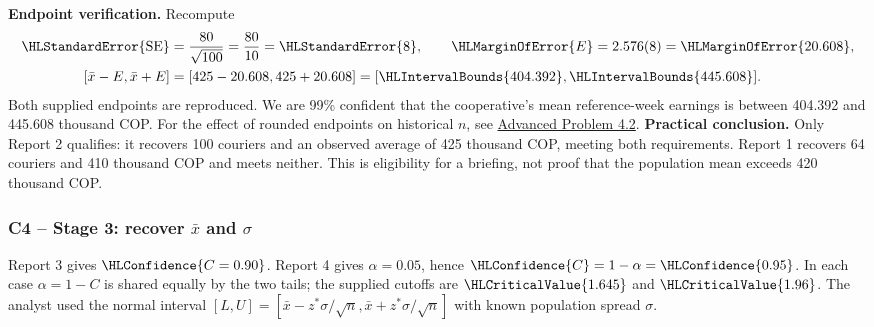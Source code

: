 \textbf{Endpoint verification.} Recompute
\[\begin{aligned}
\HLStandardError{\mathrm{SE}}&=\frac{80}{\sqrt{100}}=\frac{80}{10}=\HLStandardError{8},\qquad \HLMarginOfError{E}=2.576(8)=\HLMarginOfError{20.608},\\
[\bar x-E,\bar x+E]&=[425-20.608,425+20.608]=[\HLIntervalBounds{404.392},\HLIntervalBounds{445.608}].
\end{aligned}\]
Both supplied endpoints are reproduced. We are 99\% confident that the cooperative's mean reference-week earnings is between 404.392 and 445.608 thousand COP.
For the effect of rounded endpoints on historical $n$, see \hyperref[prob:c4-advanced-2]{Advanced Problem 4.2}.
\textbf{Practical conclusion.} Only Report 2 qualifies: it recovers 100 couriers and an observed average of 425 thousand COP, meeting both requirements. Report 1 recovers 64 couriers and 410 thousand COP and meets neither. This is eligibility for a briefing, not proof that the population mean exceeds 420 thousand COP.
\clearpage
\subsubsection*{C4 -- Stage 3: recover $\bar x$ and $\sigma$}\label{sol:c4-1-c}
\begingroup
\setlength{\abovedisplayskip}{6pt}
\setlength{\belowdisplayskip}{6pt}
\setlength{\abovedisplayshortskip}{3pt}
\setlength{\belowdisplayshortskip}{4pt}
\setlength{\parskip}{4pt}

Report 3 gives $\HLConfidence{C=0.90}$. Report 4 gives $\alpha=0.05$, hence $\HLConfidence{C}=1-\alpha=\HLConfidence{0.95}$. In each case $\alpha=1-C$ is shared equally by the two tails; the supplied cutoffs are $\HLCriticalValue{1.645}$ and $\HLCriticalValue{1.96}$. The analyst used the normal interval $[L,U]=[\bar x-z^*\sigma/\sqrt n,\bar x+z^*\sigma/\sqrt n]$ with known population spread $\sigma$.

